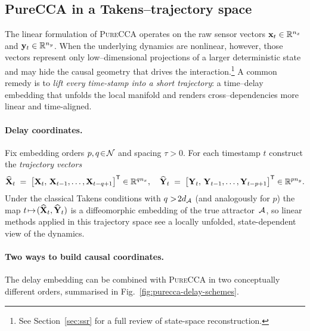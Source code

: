 \documentclass[14pt]{extarticle}
\begin{document}
	\subsection{PureCCA in a Takens–trajectory space}\label{subsec:purecca-traj}
	
	The linear formulation of \textsc{PureCCA} operates on the raw sensor
	vectors $\mathbf{x}_t\in\mathbb{R}^{n_x}$ and $\mathbf{y}_t\in\mathbb{R}^{n_y}$.  
	When the underlying dynamics are nonlinear, however, those vectors
	represent only low–dimensional projections of a larger deterministic
	state and may hide the causal geometry that drives the
	interaction.\footnote{See Section~\ref{sec:ssr} for a full review of
		state-space reconstruction.}  
	A common remedy is to \emph{lift every time-stamp into a
		short trajectory}: a time–delay embedding that unfolds the local
	manifold and renders cross–dependencies more linear and
	time-aligned.
	
	\paragraph{Delay coordinates.}
	Fix embedding orders $p,q\!\in\!\mathcal{N}$ and spacing $\tau>0$.  
	For each timestamp $t$ construct the
	\emph{trajectory vectors}
	\[
	\widehat{\mathbf{X}}_t \;=\;
	\bigl[\mathbf{X}_t,\,\mathbf{X}_{t-1},\dots,\mathbf{X}_{t-q+1}\bigr]^{\mathsf{T}}\in\mathbb{R}^{q n_x},
	\quad
	\widehat{\mathbf{Y}}_t \;=\;
	\bigl[\mathbf{Y}_t,\,\mathbf{Y}_{t-1},\dots,\mathbf{Y}_{t-p+1}\bigr]^{\mathsf{T}}\in\mathbb{R}^{p n_y}.
	\]
	Under the classical Takens conditions with $q>\!2d_{\mathcal{A}}$ (and
	analogously for $p$) the map
	$t\!\mapsto\!(\widehat{\mathbf{X}}_t,\widehat{\mathbf{Y}}_t)$ is a diffeomorphic
	embedding of the true attractor~$\mathcal{A}$, so linear methods applied in this
	trajectory space see a locally unfolded, \mbox{state-dependent} view of
	the dynamics.
	
	\paragraph{Two ways to build causal coordinates.}
	The delay embedding can be combined with \textsc{PureCCA} in two
	conceptually different orders, summarised in
	Fig.~\ref{fig:purecca-delay-schemes}.
	
\end{document}
